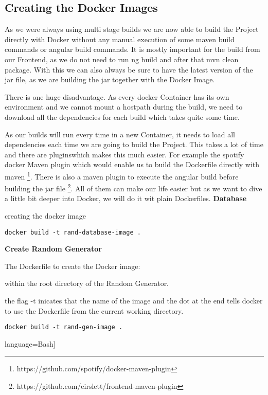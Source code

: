 \subsection{Creating the Docker Images}
As we were always using multi stage builds we are now able to build the Project directly with Docker without any manual execution of some maven build commands or angular build commands.
It is mostly important for the build from our Frontend, as we do not need to run ng build and after that mvn clean package.
With this we can also always be sure to have the latest version of the jar file, as we are building the jar together with the Docker Image.

There is one huge disadvantage. As every docker Container has its own environment and we cannot mount a hostpath during the build, we need to download all the dependencies for each build which takes quite some time.

As our builds will run every time in a new Container, it needs to load all dependencies each time we are going to build the Project. This takes a lot of time and there are pluginswhich makes this much easier.
For example the spotify docker Maven plugin which would enable us to build the Dockerfile directly with maven \footnote{https://github.com/spotify/docker-maven-plugin}.
There is also a maven plugin to execute the angular build before building the jar file \footnote{https://github.com/eirslett/frontend-maven-plugin}.
All of them can make our life easier but as we want to dive a little bit deeper into Docker, we will do it wit plain Dockerfiles.
\textbf{Database}



creating the docker image
\begin{verbatim}
docker build -t rand-database-image .
\end{verbatim}

\textbf{Create Random Generator}

The Dockerfile to create the Docker image:


within the root directory of the Random Generator.

the flag -t inicates that the name of the image and the dot at the end tells docker to use the Dockerfile from the current working directory.

\begin{verbatim}
docker build -t rand-gen-image .
\end{verbatim}language=Bash]


